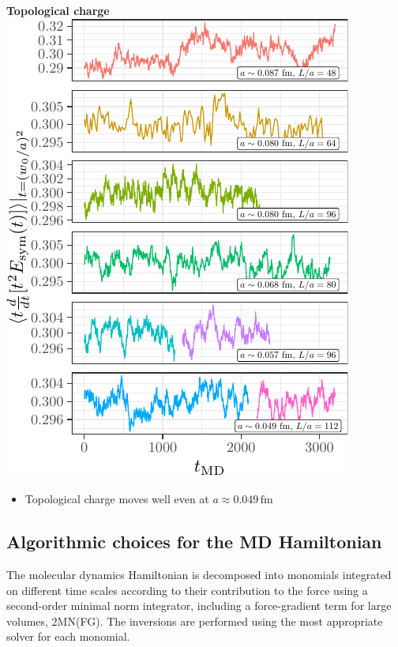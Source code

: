 \documentclass[a0,portrait]{a0poster}
\begin{document}
\begin{multicols}{2}
\begin{minipage}{0.48\linewidth}
        \textbf{\hspace{3cm}Topological charge}\\
        \includegraphics[width=\linewidth,page=2]{data/gf_observables/gf_observables_md_histories}
        \begin{itemize}
            \item Topological charge moves well even at $a\approx 0.049 \, \mathrm{fm}$
        \end{itemize}
    \end{minipage}

    \subsection*{Algorithmic choices for the MD Hamiltonian}
    \noindent The molecular dynamics Hamiltonian is decomposed into monomials integrated on different time scales according to their contribution to the force using a second-order minimal norm integrator, including a force-gradient term for large volumes, 2MN(FG). The inversions are performed using the most appropriate solver for each monomial.
    \vspace{0.5cm}


\end{multicols}
\end{document}
